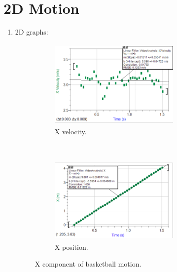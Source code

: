 \documentclass[12pt]{article}
\begin{document}
    \pagebreak


    \section{2D Motion}

    \begin{enumerate}
        \item 2D graphs:
        \begin{figure}[H]
            \begin{subfigure}[t]{0.5\textwidth}
                \centering
                \includegraphics[height=1.7in, width=2.5in]{2d_x_velo_(Custom)}
                \caption{X velocity.}
            \end{subfigure}%
            ~
            \begin{subfigure}[t]{0.5\textwidth}
                \centering
                \includegraphics[height=1.7in, width=2.5in]{2d_x_pos_(Custom)}
                \caption{X position.}
            \end{subfigure}
            \caption{X component of basketball motion.}
        \end{figure}


\end{enumerate}
\end{document}
